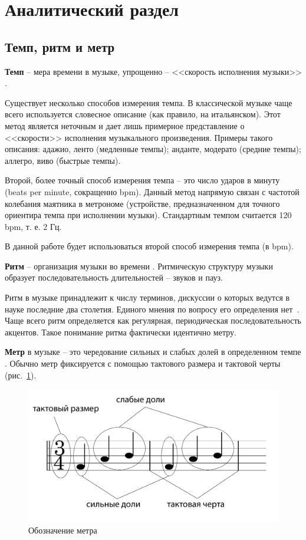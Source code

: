 \section{Аналитический раздел}
\setcounter{figure}{0}
\setcounter{table}{0}

\subsection{Темп, ритм и метр}

\textbf{Темп} -- мера времени в музыке, упрощенно -- <<скорость исполнения музыки>> \cite{grouv}.

Существует несколько способов измерения темпа. В классической музыке чаще всего используется словесное описание (как правило, на итальянском). Этот метод является неточным и дает лишь примерное представление о <<скорости>> исполнения музыкального произведения. Примеры такого описания: адажио, ленто (медленные темпы); анданте, модерато (средние темпы); аллегро, виво (быстрые темпы).

Второй, более точный способ измерения темпа -- это число ударов в минуту (beats per minute, сокращенно bpm). Данный метод напрямую связан с частотой колебания маятника в метрономе (устройстве, предназначенном для точного ориентира темпа при исполнении музыки). Стандартным темпом считается 120 bpm, т. е. 2 Гц.

В данной работе будет использоваться второй способ измерения темпа (в bpm).

\textbf{Ритм} -- организация музыки во времени \cite{chehovich}. Ритмическую структуру музыки образует последовательность длительностей -- звуков и пауз.

Ритм в музыке принадлежит к числу терминов, дискуссии о которых ведутся в науке последние два столетия. Единого мнения по вопросу его определения нет~\cite{rhythm}. Чаще всего ритм определяется как регулярная, периодическая последовательность акцентов. Такое понимание ритма фактически идентично метру.

\textbf{Метр} в музыке -- это чередование сильных и слабых долей в определенном темпе \cite{grouv}. Обычно метр фиксируется с помощью тактового размера и тактовой черты (рис.~\ref{img:meter}).

\begin{figure}[h]
	\centering
	\includegraphics[scale=0.4]{svg/barlines.pdf}
	\caption{Обозначение метра}
	\label{img:meter}
\end{figure}

